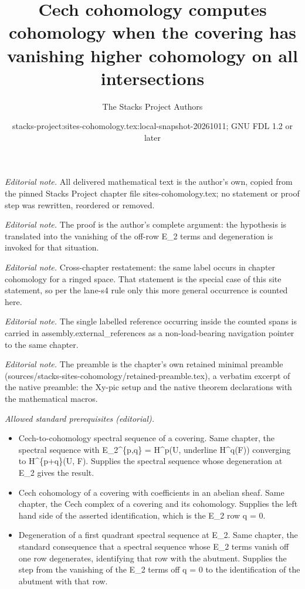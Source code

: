 \documentclass[10pt,a4paper]{amsart}
\title{Cech cohomology computes cohomology when the covering has vanishing higher cohomology on all intersections}
\author{The Stacks Project Authors}
\date{stacks-project:sites-cohomology.tex:local-snapshot-20261011; GNU FDL 1.2 or later}
\theoremstyle{plain}
\theoremstyle{definition}
\theoremstyle{remark}
\numberwithin{equation}{subsection}
\begin{document}
\maketitle
\noindent\textit{Editorial note.} All delivered mathematical text is the author's own, copied from the pinned Stacks Project chapter file sites-cohomology.tex; no statement or proof step was rewritten, reordered or removed.\par\medskip
\noindent\textit{Editorial note.} The proof is the author's complete argument: the hypothesis is translated into the vanishing of the off-row E\_2 terms and degeneration is invoked for that situation.\par\medskip
\noindent\textit{Editorial note.} Cross-chapter restatement: the same label occurs in chapter cohomology for a ringed space. That statement is the special case of this site statement, so per the lane-s4 rule only this more general occurrence is counted here.\par\medskip
\noindent\textit{Editorial note.} The single labelled reference occurring inside the counted spans is carried in assembly.external\_references as a non-load-bearing navigation pointer to the same chapter.\par\medskip
\noindent\textit{Editorial note.} The preamble is the chapter's own retained minimal preamble (sources/stacks-sites-cohomology/retained-preamble.tex), a verbatim excerpt of the native preamble: the Xy-pic setup and the native theorem declarations with the mathematical macros.\par\medskip
\noindent\textit{Allowed standard prerequisites (editorial).}\begin{itemize}
\item Cech-to-cohomology spectral sequence of a covering. Same chapter, the spectral sequence with E\_2\textasciicircum{}\{p,q\} = H\textasciicircum{}p(U, underline H\textasciicircum{}q(F)) converging to H\textasciicircum{}\{p+q\}(U, F). Supplies the spectral sequence whose degeneration at E\_2 gives the result.
\item Cech cohomology of a covering with coefficients in an abelian sheaf. Same chapter, the Cech complex of a covering and its cohomology. Supplies the left hand side of the asserted identification, which is the E\_2 row q = 0.
\item Degeneration of a first quadrant spectral sequence at E\_2. Same chapter, the standard consequence that a spectral sequence whose E\_2 terms vanish off one row degenerates, identifying that row with the abutment. Supplies the step from the vanishing of the E\_2 terms off q = 0 to the identification of the abutment with that row.
\end{itemize}\medskip
\end{document}
